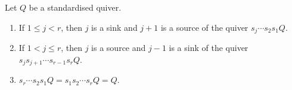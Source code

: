 Let $Q$ be a standardised quiver.
\begin{enumerate}[label=(\roman*)]
	\item If $1\leq j < r$, then $j$ is a sink and $j+1$ is a source of the
		quiver $s_j\cdots s_2s_1Q$.
	\item If $1 < j \leq r$, then $j$ is a source and $j-1$ is a sink of
		the quiver $s_js_{j+1}\cdots s_{r-1}s_rQ$.
	\item $s_r\cdots s_2s_1Q = s_1s_2\cdots s_rQ = Q$.
\end{enumerate}
